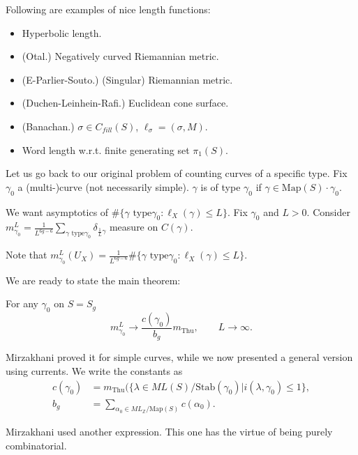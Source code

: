 \begin{example}
\label{example-nice-length-functions}
Following are examples of nice length
functions:
\begin{itemize}
\item Hyperbolic length.
\item (Otal.) Negatively curved Riemannian
metric.
\item (E-Parlier-Souto.) (Singular)
Riemannian metric.
\item (Duchen-Leinhein-Rafi.) Euclidean cone
surface.
\item (Banachan.) $\sigma \in C_{fill}(S)$,
$\ell_{\sigma}=(\sigma,M)$.
\item Word length w.r.t. finite generating
set $\pi_1(S)$.
\end{itemize}
\end{example}

\medskip\noindent
Let us go back to our original problem
of counting curves of a specific type.
Fix $\gamma_0$ a (multi-)curve (not
necessarily simple).
$\gamma$ is of type $\gamma_0$ if
$\gamma \in \text{Map}(S)\cdot \gamma_0$.

We want asymptotics of
$\#\{\gamma\text{ type
}\gamma_0:\ell_X(\gamma)\leq L\}$.
Fix $\gamma_0$ and $L>0$. Consider
$m^L_{\gamma_0}=\frac{1}{L^{6g-6}}
\sum_{\gamma\text{ type
}\gamma_0}\delta_{\frac{1}{L}\gamma}$
measure on $C(\gamma)$.

Note that $m^L_{\gamma_0}(U_X)=
\frac{1}{L^{6g-6}}\#
\{\gamma\text{ type
}\gamma_0:\ell_X(\gamma)\leq L\}$.

We are ready to state the main theorem:

\begin{theorem}
\label{theorem-mirzakhani-e-souto}
For any $\gamma_0$ on $S=S_g$
$$
m^L_{\gamma_0}\to\frac{c(\gamma_0)}{b_g}
m_{\text{Thu}},\qquad
L\to \infty.
$$
\end{theorem}

\noindent
Mirzakhani proved it for simple curves,
while we now presented a general version
using currents.
We write the constants as
$$
\begin{aligned}
c(\gamma_0)&=m_{\text{Thu}}(\{\lambda \in
ML(S)/\text{Stab}(\gamma_0)
|i(\lambda,\gamma_0)\leq 1\},\\
b_g&=\sum_{\alpha_0 \in
ML_\mathbb{Z}/\text{Map}(S)}c(\alpha_0).
\end{aligned}
$$

\noindent
Mirzakhani used another expression.
This one has the virtue of being purely
combinatorial.

